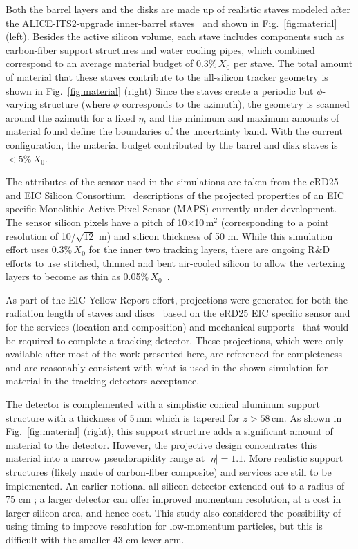 Both the barrel layers and the disks are made up of realistic staves modeled after the ALICE-ITS2-upgrade inner-barrel staves~\cite{Abelevetal:2014dna,Keil:2015vta,Reidt:2016ysg}
and shown in Fig.~\ref{fig:material} (left).
Besides the active silicon volume, each stave includes components such as carbon-fiber support structures and water cooling pipes, which combined correspond to an average material budget of 0.3$\% \,X_0$ per stave.
The total amount of material that these staves contribute to the all-silicon tracker geometry is shown in Fig.~\ref{fig:material} (right)
Since the staves create a periodic but $\phi$-varying structure (where $\phi$ corresponds to the azimuth), the geometry is scanned around the azimuth for a fixed $\eta$, and the minimum and maximum amounts of material found define the boundaries of the uncertainty band.
With the current configuration, the material budget contributed by the barrel and disk staves is $<5\%\,X_0$.

The attributes of the sensor used in the simulations are taken from the eRD25 and EIC Silicon Consortium~\cite{eRD25} descriptions of the projected properties of an EIC specific Monolithic Active Pixel Sensor (MAPS) currently under development.
The sensor silicon pixels have a pitch of 10$\times$10\,\textmu m$^2$ (corresponding to a point resolution of 10/$\sqrt{12}$ \textmu m) and silicon thickness of 50 \textmu m. While this simulation effort uses 0.3$\% \,X_0$ for the inner two tracking layers, there are ongoing R\&D efforts to use stitched, thinned and bent air-cooled silicon to allow the vertexing layers to become as thin as 0.05$\% \,X_0$~\cite{its3det}. 

As part of the EIC Yellow Report effort, projections were generated for both the radiation length of staves and discs~\cite{leo} based on the eRD25 EIC specific sensor and for the services (location and composition) and mechanical supports~\cite{leo2} that would be required to complete a tracking detector. These projections, which were only available after most of the work presented here, are referenced for completeness and are reasonably consistent with what is used in the shown simulation for material in the tracking detectors acceptance.

The detector is complemented with a simplistic conical aluminum support structure with a thickness of 5\,mm which is tapered for $z>58$\,cm. As shown in Fig.~\ref{fig:material} (right), this support structure adds a significant amount of material 
to the detector. However, the projective design concentrates this material into a narrow pseudorapidity range at $|\eta|=1.1$.
More realistic support structures (likely made of carbon-fiber composite) and services are still to be implemented.  
An earlier notional all-silicon detector extended out to a radius of 75 cm \cite{Klein:2020sts}; a larger detector can offer improved momentum resolution, at a cost in larger silicon area, and hence cost.  This study also considered the possibility of using timing to improve resolution for low-momentum particles, but this is difficult with the smaller 43 cm lever arm.

